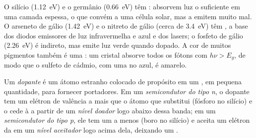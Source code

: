 O silício (\qty{1.12}{eV}) e o germânio (\qty{0.66}{eV}) têm :
absorvem luz o suficiente em uma camada espessa, o que convém a uma célula solar, mas
a emitem muito mal. O arseneto de gálio (\qty{1.42}{eV}) e o nitreto de gálio (cerca de
\qty{3.4}{eV}) têm , a base dos diodos emissores de luz
infravermelha e azul e dos lasers; o fosfeto de gálio (\qty{2.26}{eV}) é indireto, mas emite luz verde
quando dopado. A cor de muitos pigmentos também é uma : um cristal
absorve todos os fótons com $h\nu > E_g$, de modo que o sulfeto de cádmio, com uma  no azul,
é amarelo.

\begin{definition}[Dopagem]\label{def:b3:solid-state:doping}
Um \emph{dopante} é um átomo estranho colocado de propósito em um ,
em pequena quantidade, para fornecer portadores. Em um \emph{semicondutor do tipo
n}, o dopante tem um elétron de valência a mais
que o átomo que substitui (fósforo no silício) e o cede à
 a partir de um \emph{nível doador} logo abaixo dessa
banda; em um \emph{semicondutor do tipo p}, ele tem um a
menos (boro no silício) e aceita um elétron da  em um
\emph{nível aceitador} logo acima dela, deixando um .
\end{definition}


